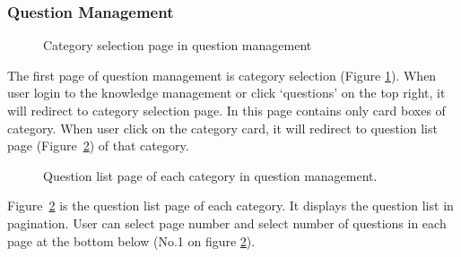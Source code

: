 \documentclass[12pt,oneside,openright,a4paper]{cpe-english-project}
\begin{document}
	\subsubsection{Question Management}
		\begin{figure}[!h]\centering
			\caption{Category selection page in question management}\label{fig:Category_selection_page_in_question_management_done}
		\end{figure}
		\begin{flushleft}
			The first page of question management is category selection (Figure \ref*{fig:Category_selection_page_in_question_management_done}). When user login to the knowledge management or click ‘questions’ on the top right, it will redirect to category selection page. In this page contains only card boxes of category. When user click on the category card, it will redirect to question list page (Figure~\ref*{fig:Question_list_page_of_each_category_in_question_management_done}) of that category.
		\end{flushleft}
\pagebreak
		\begin{figure}[!h]\centering
			\caption{Question list page of each category in question management.}\label{fig:Question_list_page_of_each_category_in_question_management_done}
		\end{figure}
		\begin{flushleft}
			Figure~\ref*{fig:Question_list_page_of_each_category_in_question_management_done} is the question list page of each category. It displays the question list in pagination. User can select page number and select number of questions in each page at the bottom below (No.1 on figure \ref*{fig:Question_list_page_of_each_category_in_question_management_done}).
		\end{flushleft}
\end{document}
